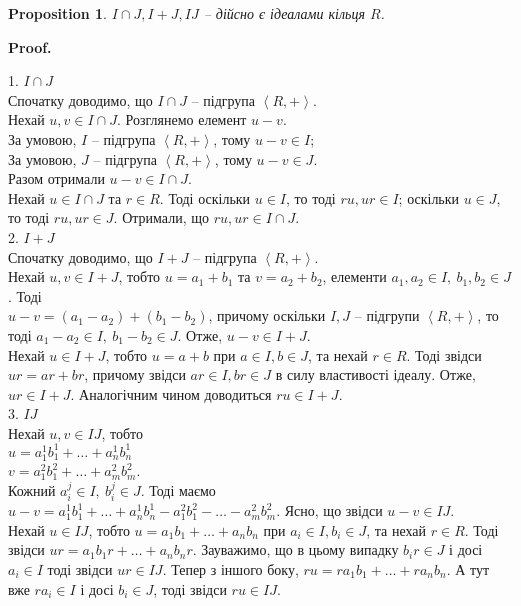 \documentclass[a4paper, 10pt]{article}
\makeatletter
\theoremstyle{theoremdd}
\theoremstyle{theoremdd}
\theoremstyle{theoremdd}
\theoremstyle{theoremdd}
\theoremstyle{theoremdd}
\theoremstyle{theoremdd}
\theoremstyle{theoremdd}
\theoremstyle{theoremdd}
\theoremstyle{theoremdd}
\newtheorem{proposition}[theorem]{Proposition}
\theoremstyle{theoremdd}
\theoremstyle{theoremdd}
\theoremstyle{theoremdd}
\theoremstyle{theoremdd}
\theoremstyle{theoremdd}
\theoremstyle{theoremdd}
\renewenvironment{proof}[1][Proof.\\]{\par
\pushQED{\hfill \qed}%
\normalfont \topsep6\p@\@plus6\p@\relax
\trivlist
\item\relax
{\bfseries
#1\@addpunct{.}}\hspace\labelsep\ignorespaces
}{%
\popQED\endtrivlist\@endpefalse
}
\makeatother
\begin{document}
\begin{proposition}
$I \cap J, I + J, IJ$ -- дійсно є ідеалами кільця $R$.
\end{proposition}

\begin{proof}
1. $I \cap J$\\
Спочатку доводимо, що $I \cap J$ -- підгрупа $\left< R, + \right>$.\\
Нехай $u,v \in I \cap J$. Розглянемо елемент $u-v$.\\
За умовою, $I$ -- підгрупа $\left<R,+\right>$, тому $u-v \in I$;\\
За умовою, $J$ -- підгрупа $\left<R,+\right>$, тому $u-v \in J$.\\
Разом отримали $u-v \in I \cap J$.\\
Нехай $u \in I \cap J$ та $r \in R$. Тоді оскільки $u \in I$, то тоді $ru, ur \in I$; оскільки $u \in J$, то тоді $ru, ur \in J$. Отримали, що $ru, ur \in I \cap J
$.
\bigskip \\
2. $I+J$\\
Спочатку доводимо, що $I + J$ -- підгрупа $\left< R, + \right>$.\\
Нехай $u,v \in I + J$, тобто $u = a_1 + b_1$ та $v = a_2 + b_2$, елементи $a_1,a_2 \in I,\ b_1,b_2 \in J$. Тоді\\
$u - v = (a_1 - a_2) + (b_1 - b_2)$, причому оскільки $I,J$ -- підгрупи $\left< R,+ \right>$, то тоді $a_1 - a_2 \in I,\ b_1 - b_2 \in J$. Отже, $u-v \in I+J$.\\
Нехай $u \in I+J$, тобто $u = a+b$ при $a \in I,b \in J$, та нехай $r \in R$. Тоді звідси $ur = ar + br$, причому звідси $ar \in I, br \in J$ в силу властивості ідеалу. Отже, $ur \in I+J$. Аналогічним чином доводиться $ru \in I+J$.
\bigskip \\
3. $IJ$\\
Нехай $u,v \in IJ$, тобто\\
$u = a_1^1 b_1^1 + \dots + a_n^1 b_n^1$\\
$v = a_1^2 b_1^2 + \dots + a_m^2 b_m^2$.\\
Кожний $a_i^j \in I,\ b_i^j \in J$. Тоді маємо\\
$u - v = a_1^1 b_1^1 + \dots + a_n^1 b_n^1 - a_1^2 b_1^2 - \dots - a_m^2 b_m^2$. Ясно, що звідси $u - v \in IJ$.\\
Нехай $u \in IJ$, тобто $u = a_1b_1 + \dots + a_nb_n$ при $a_i \in I, b_i \in J$, та нехай $r \in R$. Тоді звідси $ur = a_1 b_1 r + \dots + a_n b_n r$. Зауважимо, що в цьому випадку $b_i r \in J$ і досі $a_i \in I$ тоді звідси $ur \in IJ$. Тепер з іншого боку, $ru = r a_1 b_1 + \dots + r a_n b_n$. А тут вже $r a_i \in I$ і досі $b_i \in J$, тоді звідси $ru \in IJ$.
\end{proof}
\end{document}
